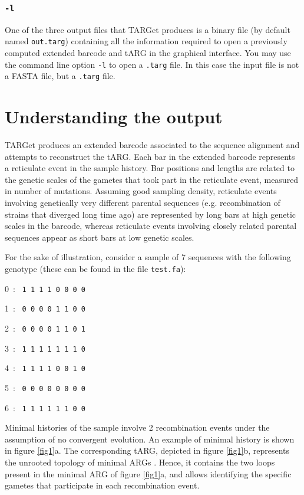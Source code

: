 \documentclass[12pt]{article}
\begin{document}
\subsubsection*{\texttt{-l}}

One of the three output files that TARGet produces is a binary file (by default named \texttt{out.targ}) containing all the information required to open a previously computed extended barcode and tARG in the graphical interface. You may use the command line option \texttt{-l} to open a \texttt{.targ} file. In this case the input file is not a FASTA file, but a \texttt{.targ} file.

\section{Understanding the output}

TARGet produces an extended barcode associated to the sequence alignment and attempts to reconstruct the tARG. Each bar in the extended barcode represents a reticulate event in the sample history. Bar positions and lengths are related to the genetic scales of the gametes that took part in the reticulate event, measured in number of mutations. Assuming good sampling density, reticulate events involving genetically very different parental sequences (e.g. recombination of strains that diverged long time ago) are represented by long bars at high genetic scales in the barcode, whereas reticulate events involving closely related parental sequences appear as short bars at low genetic scales.

For the sake of illustration, consider a sample of 7 sequences with the following genotype (these can be found in the file \texttt{test.fa}):

0\ : \ \texttt{1 1 1 1 0 0 0 0}

1\ : \ \texttt{0 0 0 0 1 1 0 0}

2\ : \ \texttt{0 0 0 0 1 1 0 1}

3\ : \ \texttt{1 1 1 1 1 1 1 0}

4\ : \ \texttt{1 1 1 1 0 0 1 0}

5\ : \ \texttt{0 0 0 0 0 0 0 0}

6\ : \ \texttt{1 1 1 1 1 1 0 0}

\noindent Minimal histories of the sample involve 2 recombination events under the assumption of no convergent evolution. An example of minimal history is shown in figure \ref{fig1}a. The corresponding tARG, depicted in figure \ref{fig1}b, represents the unrooted topology of minimal ARGs \cite{target}. Hence, it contains the two loops present in the minimal ARG of figure \ref{fig1}a, and allows identifying the specific gametes that participate in each recombination event. 
\end{document}
